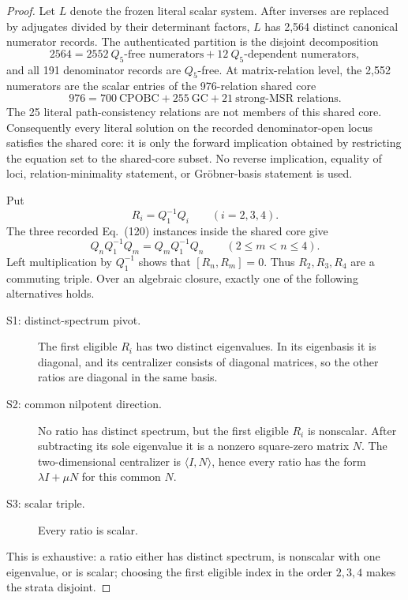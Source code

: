 \documentclass[11pt]{article}
\theoremstyle{definition}
\theoremstyle{remark}
\begin{document}
\begin{proof}
Let \(L\) denote the frozen literal scalar system.  After inverses are
replaced by adjugates divided by their determinant factors, \(L\) has 2,564
distinct canonical numerator records.  The authenticated partition is the
disjoint decomposition
\[
  2564=2552\ \text{\(Q_5\)-free numerators}
       +12\ \text{\(Q_5\)-dependent numerators},
\]
and all 191 denominator records are \(Q_5\)-free.  At matrix-relation level,
the 2,552 numerators are the scalar entries of the 976-relation shared core
\[
  976=700\ \mathrm{CPOBC}+255\ \mathrm{GC}
      +21\ \text{strong-MSR relations}.
\]
The 25 literal path-consistency relations are not members of this shared
core.  Consequently every literal solution on the recorded denominator-open
locus satisfies the shared core: it is only the forward implication obtained
by restricting the equation set to the shared-core subset.  No reverse implication,
equality of loci, relation-minimality statement, or Gr\"obner-basis statement
is used.

Put
\[
  R_i=Q_1^{-1}Q_i\qquad(i=2,3,4).
\]
The three recorded Eq.~(120) instances inside the shared core give
\[
  Q_nQ_1^{-1}Q_m=Q_mQ_1^{-1}Q_n
  \qquad(2\leq m<n\leq4).
\]
Left multiplication by \(Q_1^{-1}\) shows that
\([R_n,R_m]=0\).  Thus \(R_2,R_3,R_4\) are a commuting triple.  Over an
algebraic closure, exactly one of the following alternatives holds.
\begin{description}
  \item[S1: distinct-spectrum pivot.] The first eligible \(R_i\) has two
        distinct eigenvalues.  In its eigenbasis it is diagonal, and its
        centralizer consists of diagonal matrices, so the other ratios are
        diagonal in the same basis.
  \item[S2: common nilpotent direction.] No ratio has distinct spectrum, but
        the first eligible \(R_i\) is nonscalar.  After subtracting its sole
        eigenvalue it is a nonzero square-zero matrix \(N\).  The
        two-dimensional centralizer is \(\langle I,N\rangle\), hence every
        ratio has the form \(\lambda I+\mu N\) for this common \(N\).
  \item[S3: scalar triple.] Every ratio is scalar.
\end{description}
This is exhaustive: a ratio either has distinct spectrum, is nonscalar with
one eigenvalue, or is scalar; choosing the first eligible index in the order
\(2,3,4\) makes the strata disjoint.


\end{proof}
\end{document}
